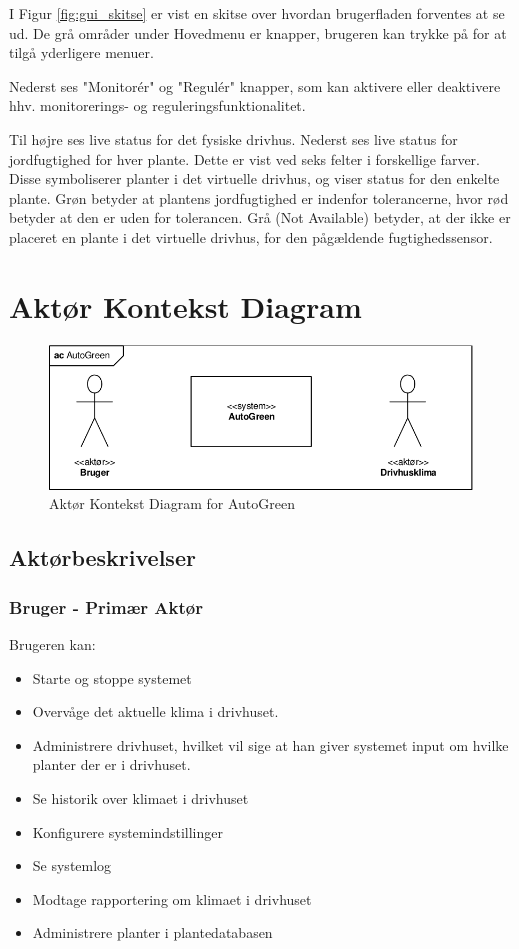 I Figur \ref{fig:gui_skitse} er vist en skitse over hvordan brugerfladen forventes at se ud. De grå områder under Hovedmenu er knapper, brugeren kan trykke på for at tilgå yderligere menuer. 

Nederst ses "Monitorér" og "Regulér" knapper, som kan aktivere eller deaktivere hhv. monitorerings- og reguleringsfunktionalitet. 

Til højre ses live status for det fysiske drivhus. Nederst ses live status for jordfugtighed for hver plante. Dette er vist ved seks felter i forskellige farver. Disse symboliserer planter i det virtuelle drivhus, og viser status for den enkelte plante. Grøn betyder at plantens jordfugtighed er indenfor tolerancerne, hvor rød betyder at den er uden for tolerancen. Grå (Not Available) betyder, at der ikke er placeret en plante i det virtuelle drivhus, for den pågældende fugtighedssensor. 


\section{Aktør Kontekst Diagram} 
\begin{figure}[h]
\centering 
\includegraphics[width={\textwidth*4/5}, trim=0 0 0 0, clip=true] {../fig/Aktoer_Kontekst_Diagram.pdf}
\caption{Aktør Kontekst Diagram for AutoGreen}
\label{fig:aktoer_kontekst_diagram}
\end{figure}

\subsection{Aktørbeskrivelser}

\subsubsection{Bruger - Primær Aktør}
Brugeren kan:
\begin{itemize}
\item Starte og stoppe systemet 
\item Overvåge det aktuelle klima i drivhuset. 
\item Administrere drivhuset, hvilket vil sige at han giver systemet input om hvilke planter der er i drivhuset. 
\item Se historik over klimaet i drivhuset
\item Konfigurere systemindstillinger
\item Se systemlog
\item Modtage rapportering om klimaet i drivhuset 
\item Administrere planter i plantedatabasen
\end{itemize}

